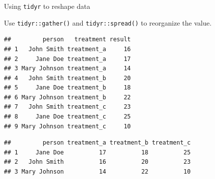 \documentclass[14pt,ignorenonframetext,]{bredelebeamer}
\newenvironment{Shaded}{\begin{snugshade}}{\end{snugshade}}
\newcommand{\KeywordTok}[1]{\textcolor[rgb]{0.94,0.87,0.69}{#1}}
\newcommand{\DataTypeTok}[1]{\textcolor[rgb]{0.87,0.87,0.75}{#1}}
\newcommand{\DecValTok}[1]{\textcolor[rgb]{0.86,0.86,0.80}{#1}}
\newcommand{\StringTok}[1]{\textcolor[rgb]{0.80,0.58,0.58}{#1}}
\newcommand{\OperatorTok}[1]{\textcolor[rgb]{0.94,0.94,0.82}{#1}}
\newcommand{\NormalTok}[1]{\textcolor[rgb]{0.80,0.80,0.80}{#1}}
\begin{document}
\begin{frame}[fragile]{Using \texttt{tidyr} to reshape data}

Use \texttt{tidyr::gather()} and \texttt{tidyr::spread()} to reorganize
the value.

\begin{Shaded}
\end{Shaded}

\begin{verbatim}
##         person   treatment result
## 1   John Smith treatment_a     16
## 2     Jane Doe treatment_a     17
## 3 Mary Johnson treatment_a     14
## 4   John Smith treatment_b     20
## 5     Jane Doe treatment_b     18
## 6 Mary Johnson treatment_b     22
## 7   John Smith treatment_c     23
## 8     Jane Doe treatment_c     25
## 9 Mary Johnson treatment_c     10
\end{verbatim}

\begin{Shaded}
\end{Shaded}

\begin{verbatim}
##         person treatment_a treatment_b treatment_c
## 1     Jane Doe          17          18          25
## 2   John Smith          16          20          23
## 3 Mary Johnson          14          22          10
\end{verbatim}

\end{frame}
\end{document}
